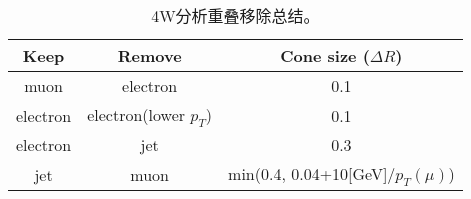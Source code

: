   \begin{table}
  \centering
  \small
  \begin{tabular}{|c|c|c|}
  \hline
               Keep        &Remove            &Cone size ($\Delta R$) \\
  \hline
               muon    &electron   &0.1 \\
  \hline
               electron     &electron(lower $p_T$)          &0.1 \\
  \hline
               electron    &jet               &0.3      \\
  \hline
               jet        &muon               &min(0.4, 0.04+10[GeV]/$p_T(\mu)$) \\
  \hline
  \end{tabular}
  \caption{4W分析重叠移除总结。}
  \label{tab:4w_olr}
  \end{table}
